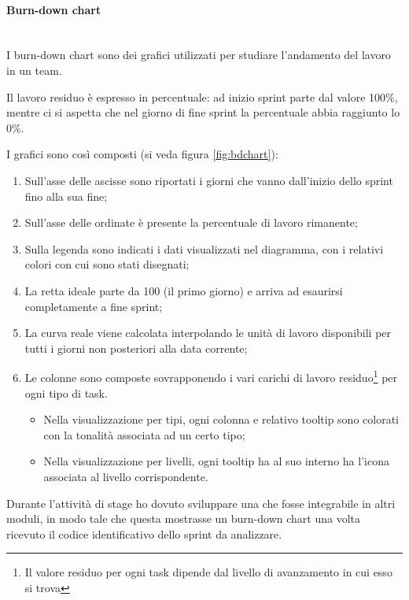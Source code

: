 \paragraph{Burn-down chart} \mbox{} \\

I burn-down chart sono dei grafici utilizzati per studiare l'andamento del
lavoro in un team.

Il lavoro residuo è espresso in percentuale: ad inizio sprint parte dal
valore 100\%, mentre ci si aspetta che nel giorno di fine sprint la
percentuale abbia raggiunto lo 0\%.

I grafici sono così composti (si veda figura \ref{fig:bdchart}):

\begin{enumerate}
\item Sull'asse delle ascisse sono riportati i giorni che vanno dall'inizio
  dello sprint fino alla sua fine;
\item Sull'asse delle ordinate è presente la percentuale di lavoro rimanente;
\item Sulla legenda sono indicati i dati visualizzati nel diagramma, con i
  relativi colori con cui sono stati disegnati;
\item La retta ideale parte da 100 (il primo giorno) e arriva ad esaurirsi
  completamente a fine sprint;
\item La curva reale viene calcolata interpolando le unità di lavoro
  disponibili per tutti i giorni non posteriori alla data corrente;
\item Le colonne sono composte sovrapponendo i vari carichi di lavoro
  residuo\footnote{Il valore residuo per ogni task dipende dal livello di
  avanzamento in cui esso si trova} per ogni tipo di task.
  \begin{itemize}
  \item Nella visualizzazione per tipi, ogni colonna e relativo tooltip sono
    colorati con la tonalità associata ad un certo tipo;
  \item Nella visualizzazione per livelli, ogni tooltip ha al suo interno ha
    l'icona associata al livello corrispondente.
  \end{itemize}
\end{enumerate}

Durante l'attività di stage ho dovuto sviluppare una  che
fosse integrabile in altri moduli, in modo tale che questa mostrasse un
burn-down chart una volta ricevuto il codice identificativo dello sprint da
analizzare.

